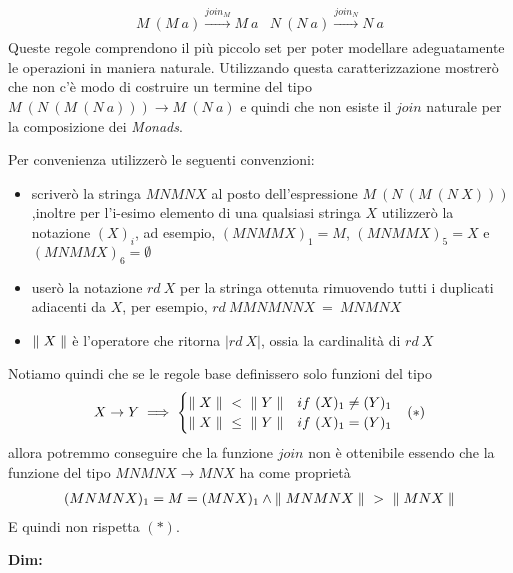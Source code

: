 \begin{align*}
  \begin{split}
    M\ (M\ a) \overset{join_M}{\longrightarrow} M\ a
  \end{split}
  \begin{split}
    N\ (N\ a) \overset{join_N}{\longrightarrow} N\ a
  \end{split}
\end{align*}
Queste regole comprendono il più piccolo set per poter modellare adeguatamente
le operazioni in maniera naturale.
Utilizzando questa caratterizzazione mostrerò che non c'è modo di costruire un
termine del tipo $M\ (N\ (M\ (N\ a))) \to M\ (N\ a)$ e quindi che non esiste il
$join$ naturale per la composizione dei \textit{Monads}.\newline

Per convenienza utilizzerò le seguenti convenzioni:
\begin{itemize}
  \item scriverò la stringa $MNMNX$ al posto dell'espressione $M\ (N\ (M\ (N\ X)))$
        ,inoltre per l'i-esimo elemento di una qualsiasi stringa $X$ utilizzerò
        la notazione $(X)_i$, ad esempio, $(MNMMX)_1 = M$, $(MNMMX)_5 = X$ e $(MNMMX)_6 = \emptyset$
  \item userò la notazione $rd\ X$ per la stringa ottenuta rimuovendo tutti i
        duplicati adiacenti da $X$, per esempio, $rd\ MMNMNNX\ =\ MNMNX$
  \item ${\parallel X\parallel}$ è l'operatore che ritorna $|rd\ X|$, ossia la cardinalità di $rd\ X$

\end{itemize}
Notiamo quindi che se le regole base definissero solo funzioni del tipo
\begin{align*}
  X \to Y \implies
  \begin{cases}
   {\parallel X\parallel}\ <\ {\parallel Y\parallel} &if\ (X)_1 \neq (Y)_1\\
   {\parallel X\parallel}\ \leq\ {\parallel Y\parallel} &if\ (X)_1 = (Y)_1
  \end{cases}
  && (*)
\end{align*}
allora potremmo conseguire che la funzione $join$ non è ottenibile essendo che
la funzione del tipo $MNMNX \to MNX$ ha come proprietà
\begin{align*}
  (MNMNX)_1 = M = (MNX)_1 \land
  {\parallel MNMNX\parallel}\ >\ {\parallel MNX\parallel}
\end{align*}
E quindi non rispetta $(*)$.\newline

\textbf{Dim:}\newline


